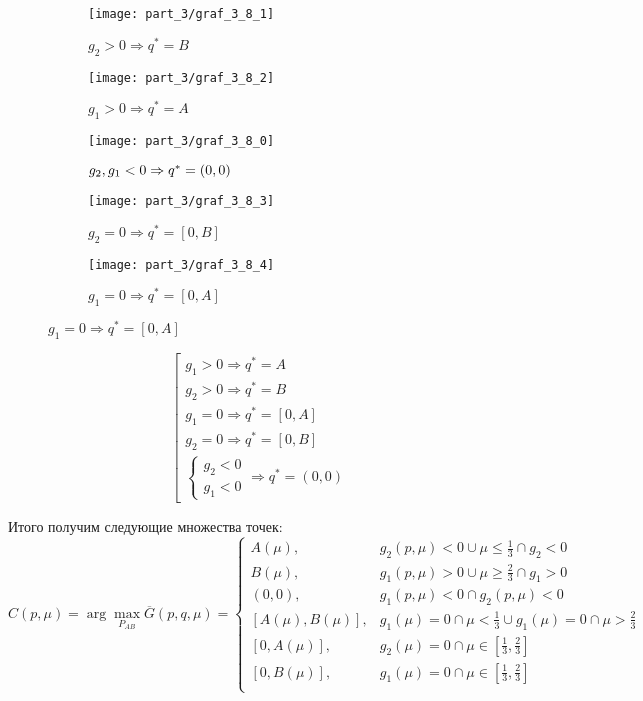 \begin{figure}[H]
   	\centering
   	\begin{subfigure}[b]{0.3 \textwidth}
       	\centering
       	\texttt{[image: part\_3/graf\_3\_8\_1]}
       	\caption{$g_2 > 0 \Rightarrow q^*=B$}
   	\end{subfigure}
   	\begin{subfigure}[b]{0.3 \textwidth}
       	\centering
       	\texttt{[image: part\_3/graf\_3\_8\_2]}
       	\caption{$g_1 > 0 \Rightarrow q^*=A$}
   	\end{subfigure}
   	\begin{subfigure}[b]{0.3 \textwidth}
       	\centering
       	\texttt{[image: part\_3/graf\_3\_8\_0]}
       	\caption{$\tiny{	
			g_2, g_1 < 0	\Rightarrow q^*=(0,0)
		}$}
   	\end{subfigure}
   	\centering
    \begin{subfigure}[b]{0.3 \textwidth}
       	\centering
       	\texttt{[image: part\_3/graf\_3\_8\_3]}
       	\caption{$g_2 = 0 \Rightarrow q^*=[0,B]$}
    \end{subfigure}
    \begin{subfigure}[b]{0.3 \textwidth}
       	\centering
       	\texttt{[image: part\_3/graf\_3\_8\_4]}
      	\caption{$g_1 = 0 \Rightarrow q^*=[0,A]$}
    \end{subfigure}
\end{figure}

$$
	\left[
	\begin{gathered}
		g_1 > 0 \Rightarrow q^*=A \\
		g_2 > 0 \Rightarrow q^*=B \\			
		g_1 = 0 \Rightarrow q^*=[0,A] \\
		g_2 = 0 \Rightarrow q^*=[0,B] \\			
		\begin{cases}			
			g_2 < 0 \\
			g_1 < 0
		\end{cases}	\Rightarrow q^*=(0,0)
	\end{gathered}
	\right.
$$


Итого получим следующие множества точек:
$$
	C(p,\mu) = \arg \max \limits_{P_{AB}} \overline{G}(p,q,\mu) =
	\begin{cases}
		A(\mu), & 
		g_2(p,\mu)<0 \cup \mu \leqslant \frac{1}{3} \cap g_2 < 0 
		\\
		B(\mu), & 
		g_1(p,\mu)>0 \cup \mu \geqslant \frac{2}{3} \cap g_1 > 0 
		\\
		(0,0),  & 
		g_1(p,\mu)<0 \cap g_2(p,\mu)<0 
		\\
		[A(\mu), B(\mu)], &
		g_1(\mu)=0 \cap \mu < \frac{1}{3} \cup
		g_1(\mu)=0 \cap \mu > \frac{2}{3} 
		\\
		[0, A(\mu)], &
		g_2(\mu)=0 \cap \mu \in [\frac{1}{3},\frac{2}{3}] 
		\\
		[0, B(\mu)], & 
		g_1(\mu)=0 \cap \mu \in [\frac{1}{3},\frac{2}{3}] 
		\\
	\end{cases}	
$$	
	
